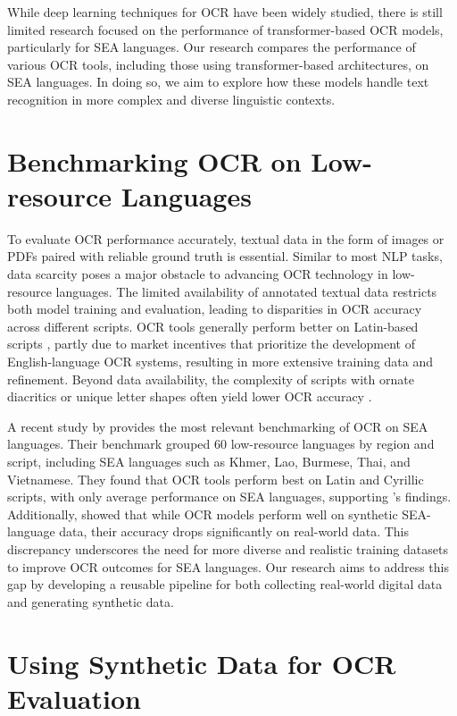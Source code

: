 \documentclass[12pt,oneside]{memoir}
\begin{document}
While deep learning techniques for OCR have been widely studied, there is still limited research focused on the performance of transformer-based OCR models, particularly for SEA languages.
Our research compares the performance of various OCR tools, including those using transformer-based architectures, on SEA languages. 
In doing so, we aim to explore how these models handle text recognition in more complex and diverse linguistic contexts.

\section{Benchmarking OCR on Low-resource Languages}

To evaluate OCR performance accurately, textual data in the form of images or PDFs paired with reliable ground truth is essential. 
Similar to most NLP tasks, data scarcity poses a major obstacle to advancing OCR technology in low-resource languages. The limited availability of annotated textual data restricts both model training and evaluation, leading to disparities in OCR accuracy across different scripts.
OCR tools generally perform better on Latin-based scripts \parencite{hegghammer-2022}, partly due to market incentives that prioritize the development of English-language OCR systems, resulting in more extensive training data and refinement.
Beyond data availability, the complexity of scripts with ornate diacritics or unique letter shapes often yield lower OCR accuracy \parencite{agarwal-and-anastasopoulos-2024}.

A recent study by \textcite{ignat-etal-2022} provides the most relevant benchmarking of OCR on SEA languages.
Their benchmark grouped 60 low-resource languages by region and script, including SEA languages such as Khmer, Lao, Burmese, Thai, and Vietnamese.
They found that OCR tools perform best on Latin and Cyrillic scripts, with only average performance on SEA languages, supporting \textcite{hegghammer-2022}'s findings.
Additionally, \textcite{ignat-etal-2022} showed that while OCR models perform well on synthetic SEA-language data, their accuracy drops significantly on real-world data.
This discrepancy underscores the need for more diverse and realistic training datasets to improve OCR outcomes for SEA languages.
Our research aims to address this gap by developing a reusable pipeline for both collecting real-world digital data and generating synthetic data.

\section{Using Synthetic Data for OCR Evaluation}
\end{document}
